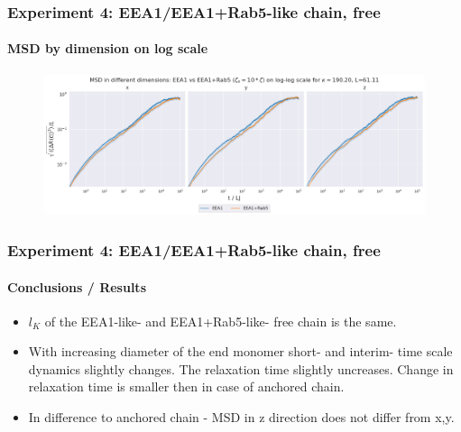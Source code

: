 \documentclass[handout]{beamer}
\begin{document}
\begin{frame}
    \frametitle{Experiment 4: EEA1/EEA1+Rab5-like chain, free}
    \framesubtitle{MSD by dimension on log scale}
    \begin{figure}[h]
        \includegraphics[width=11.2cm]{./17-exp-msd-dim-log.png}
    \end{figure}
\end{frame}

\begin{frame}
    \frametitle{Experiment 4: EEA1/EEA1+Rab5-like chain, free}
    \framesubtitle{Conclusions / Results}
    \begin{itemize}
        \item $l_K$ of the EEA1-like- and EEA1+Rab5-like- free chain is the same.
        \item With increasing diameter of the end monomer short- and interim- time
        scale dynamics slightly changes. The relaxation time slightly uncreases. 
        Change in relaxation time is smaller then in case of anchored chain.
        \item In difference to anchored chain - MSD in z direction does not differ from x,y.
    \end{itemize}
\end{frame}
\end{document}
